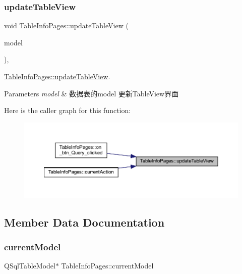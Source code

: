 \subsubsection{\texorpdfstring{updateTableView}{updateTableView}}
{\footnotesize\ttfamily void Table\+Info\+Pages\+::update\+Table\+View (\begin{DoxyParamCaption}\item[{Q\+Sql\+Table\+Model $\ast$}]{model }\end{DoxyParamCaption})\hspace{0.3cm}{\ttfamily [private]}, {\ttfamily [slot]}}



\mbox{\hyperlink{class_table_info_pages_a36dc73fa99cf8cfb6139ff33a1cd9741}{Table\+Info\+Pages\+::update\+Table\+View}}. 


\begin{DoxyParams}{Parameters}
{\em model} & 数据表的model 更新\+Table\+View界面 \\
\hline
\end{DoxyParams}
Here is the caller graph for this function\+:
\nopagebreak
\begin{figure}[H]
\begin{center}
\leavevmode
\includegraphics[width=350pt]{class_table_info_pages_a36dc73fa99cf8cfb6139ff33a1cd9741_icgraph}
\end{center}
\end{figure}


\subsection{Member Data Documentation}
\mbox{\label{class_table_info_pages_a9e63478f73b6775d0c5232a8b9b5c854}} 
\subsubsection{\texorpdfstring{currentModel}{currentModel}}
{\footnotesize\ttfamily Q\+Sql\+Table\+Model$\ast$ Table\+Info\+Pages\+::current\+Model\hspace{0.3cm}{\ttfamily [private]}}


